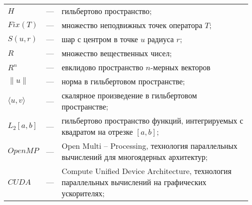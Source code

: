 
\begin{longtable}{lp{}p{}}
	
$H$ & --- & гильбертово пространство;\\

$Fix(T)$ & --- & множество неподвижных точек оператора $T$;\\

$S(u, r)$ & --- & шар с центром в точке $u$ радиуса $r$;\\

$R$ & --- & множество вещественных чисел;\\

$R^n$ & --- & евклидово пространство $n$-мерных векторов \\

$\|u\|$ & --- & норма в гильбертовом пространстве;\\

$\langle u, v\rangle$ & --- & скалярное произведение в гильбертовом пространстве;\\

$L_2[a, b]$ & --- & гильбертово пространство функций, интегрируемых с квадратом на отрезке $[a, b]$;\\

$OpenMP$ & --- & Open Multi -- Processing, технология параллельных вычислений для многоядерных архитектур;\\

$CUDA$ & --- & Compute Unified Device Architecture, технология параллельных вычислений на графических ускорителях;\\

\end{longtable}
